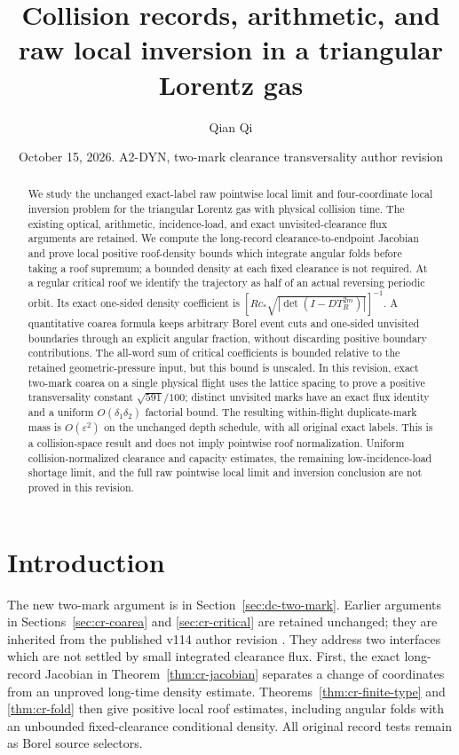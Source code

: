 \documentclass[11pt,reqno]{amsart}
\title[Collision records and raw local inversion]{Collision records, arithmetic, and raw local inversion in a triangular Lorentz gas}
\author{Qian Qi}
\date{October 15, 2026. A2-DYN, two-mark clearance transversality author revision}
\numberwithin{equation}{section}
\theoremstyle{definition}\newtheorem{definition}[theorem]{Definition}
\theoremstyle{remark}\newtheorem{remark}[theorem]{Remark}
\begin{document}
\raggedbottom
\begin{abstract}
We study the unchanged exact-label raw pointwise local limit and
four-coordinate local inversion problem for the triangular Lorentz
gas with physical collision time. The existing optical, arithmetic,
incidence-load, and exact unvisited-clearance flux arguments are
retained. We compute the long-record clearance-to-endpoint Jacobian
and prove local positive roof-density bounds which integrate angular
folds before taking a roof supremum; a bounded density at each fixed
clearance is not required. At a regular critical roof we identify the
trajectory as half of an actual reversing periodic orbit. Its exact
one-sided density coefficient is
$[Rc_*\sqrt{|\det(I-DT_R^{2m})|}]^{-1}$.
A quantitative coarea formula keeps arbitrary Borel event cuts and
one-sided unvisited boundaries through an explicit angular fraction,
without discarding positive boundary contributions. The all-word sum
of critical coefficients is bounded relative to the retained
geometric-pressure input, but this bound is unscaled. In this revision, exact two-mark coarea on a single physical flight
uses the lattice spacing to prove a positive transversality constant
$\sqrt{591}/100$; distinct unvisited marks have an exact flux identity
and a uniform $O(\delta_1\delta_2)$ factorial bound.
The resulting within-flight duplicate-mark mass is $O(\varepsilon^2)$
on the unchanged depth schedule, with all original exact labels.
This is a collision-space result and does not imply pointwise roof
normalization. Uniform
collision-normalized clearance and capacity estimates, the remaining
low-incidence-load shortage limit, and the full raw pointwise local
limit and inversion conclusion are not proved in this revision.
\end{abstract}
\maketitle

\section*{Introduction}
The new two-mark argument is in Section~\ref{sec:dc-two-mark}.
Earlier arguments in Sections~\ref{sec:cr-coarea} and
\ref{sec:cr-critical} are retained unchanged; they are inherited
from the published v114 author revision \cite{Q114}. They address two interfaces which are not
settled by small integrated clearance flux. First, the exact
long-record Jacobian in Theorem~\ref{thm:cr-jacobian} separates a
change of coordinates from an unproved long-time density estimate.
Theorems~\ref{thm:cr-finite-type} and \ref{thm:cr-fold} then give
positive local roof estimates, including angular folds with an
unbounded fixed-clearance conditional density. All original record
tests remain as Borel source selectors.
\end{document}
